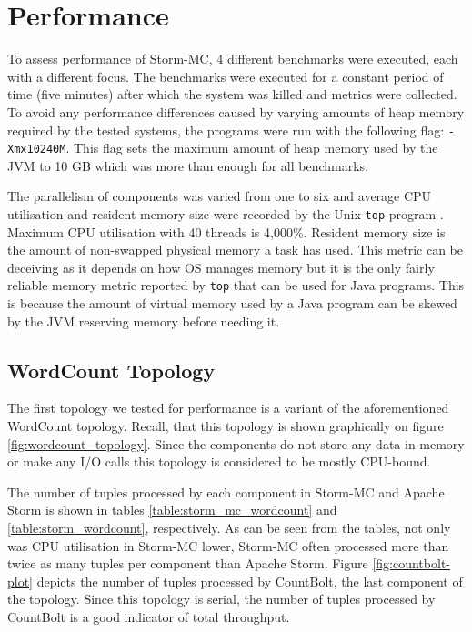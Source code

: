 \section{Performance}
\label{sec:performance}

To assess performance of Storm-MC, 4 different benchmarks were executed, each with a different focus. The benchmarks were executed for a constant period of time (five minutes) after which the system was killed and metrics were collected. To avoid any performance differences caused by varying amounts of heap memory required by the tested systems, the programs were run with the following flag: \texttt{-Xmx10240M}. This flag sets the maximum amount of heap memory used by the JVM to 10 GB which was more than enough for all benchmarks.

The parallelism of components was varied from one to six and average CPU utilisation and resident memory size were recorded by the Unix \texttt{top} program \citep{UnixTop}. Maximum CPU utilisation with 40 threads is 4,000\%. Resident memory size is the amount of non-swapped physical memory a task has used. This metric can be deceiving as it depends on how OS manages memory but it is the only fairly reliable memory metric reported by \texttt{top} that can be used for Java programs. This is because the amount of virtual memory used by a Java program can be skewed by the JVM reserving memory before needing it.

\subsection{WordCount Topology}

The first topology we tested for performance is a variant of the aforementioned WordCount topology. Recall, that this topology is shown graphically on figure \ref{fig:wordcount_topology}. Since the components do not store any data in memory or make any I/O calls this topology is considered to be mostly CPU-bound.

The number of tuples processed by each component in Storm-MC and Apache Storm is shown in tables \ref{table:storm_mc_wordcount} and \ref{table:storm_wordcount}, respectively. As can be seen from the tables, not only was CPU utilisation in Storm-MC lower, Storm-MC often processed more than twice as many tuples per component than Apache Storm. Figure \ref{fig:countbolt-plot} depicts the number of tuples processed by CountBolt, the last component of the topology. Since this topology is serial, the number of tuples processed by CountBolt is a good indicator of total throughput.

